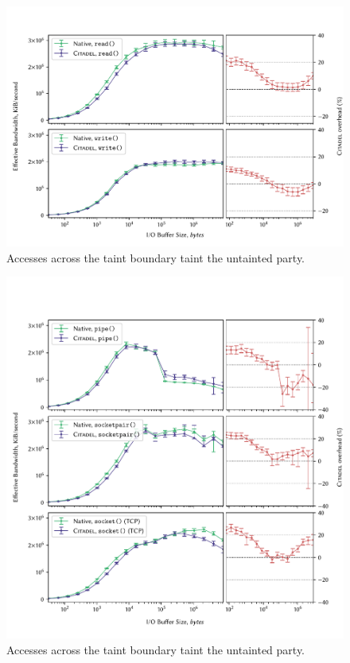 \paragraph{} 

\begin{figure}[]
    \centering
    \includegraphics[width=\linewidth]{figures/graphs/io.pdf}
    \caption[Accesses across the taint boundary]{Accesses across the taint boundary taint the untainted party.}
    \label{fig:io-graph}
\end{figure}


\begin{figure}[]
    \centering
    \includegraphics[width=\linewidth]{figures/graphs/ipc-2thread.pdf}
    \caption[Accesses across the taint boundary]{Accesses across the taint boundary taint the untainted party.}
    \label{fig:ipc-2thread-graph}
\end{figure}


